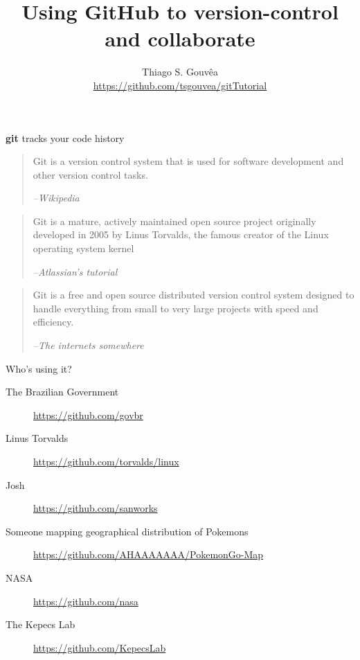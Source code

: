 \documentclass[11pt]{beamer}
\author{Thiago S. Gouvêa \\ \vspace{1cm} \url{https://github.com/tsgouvea/gitTutorial}}
\title{Using GitHub to version-control and collaborate}
\begin{document}
\begin{frame}
\titlepage
\end{frame}


\begin{frame}{\textbf{git} tracks your code history}
\begin{quote}
Git is a version control system that is used for software development and other version control tasks.
\begin{flushright}
\textit{--Wikipedia}
\end{flushright}
\end{quote}
\begin{quote}
Git is a mature, actively maintained open source project originally developed in 2005 by Linus Torvalds, the famous creator of the Linux operating system kernel
\begin{flushright}
\textit{--Atlassian's tutorial}
\end{flushright}
\end{quote}
\begin{quote}
Git is a free and open source distributed version control system designed to handle everything from small to very large projects with speed and efficiency.
\begin{flushright}
\textit{--The internets somewhere}
\end{flushright}
\end{quote}
\end{frame}

\begin{frame}{Who's using it?}
\begin{description}
\item[The Brazilian Government]{\url{https://github.com/govbr}} \\ \pause
\item[Linus Torvalds]{\url{https://github.com/torvalds/linux}} \\ \pause
\item[Josh]{\url{https://github.com/sanworks}} \pause
\item[Someone mapping geographical distribution of Pokemons]{\url{https://github.com/AHAAAAAAA/PokemonGo-Map}} \pause
\item[NASA]{\url{https://github.com/nasa}} \\ \pause
\item[The Kepecs Lab]{\url{https://github.com/KepecsLab}}
\end{description}
\end{frame}
\end{document}
